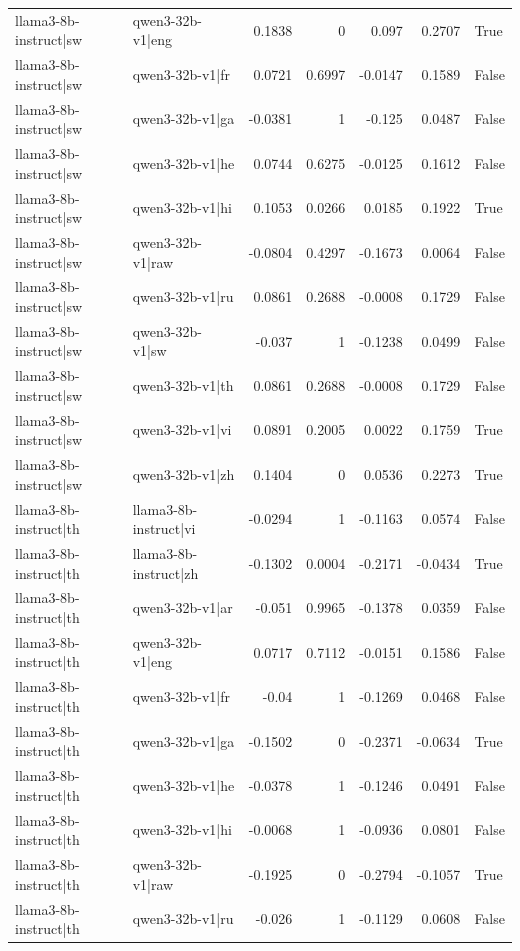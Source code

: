 \begin{table}
\begin{tabular}{l l r r r r l}
llama3-8b-instruct|sw & qwen3-32b-v1|eng & 0.1838 & 0 & 0.097 & 0.2707 & True \\
llama3-8b-instruct|sw & qwen3-32b-v1|fr & 0.0721 & 0.6997 & -0.0147 & 0.1589 & False \\
llama3-8b-instruct|sw & qwen3-32b-v1|ga & -0.0381 & 1 & -0.125 & 0.0487 & False \\
llama3-8b-instruct|sw & qwen3-32b-v1|he & 0.0744 & 0.6275 & -0.0125 & 0.1612 & False \\
llama3-8b-instruct|sw & qwen3-32b-v1|hi & 0.1053 & 0.0266 & 0.0185 & 0.1922 & True \\
llama3-8b-instruct|sw & qwen3-32b-v1|raw & -0.0804 & 0.4297 & -0.1673 & 0.0064 & False \\
llama3-8b-instruct|sw & qwen3-32b-v1|ru & 0.0861 & 0.2688 & -0.0008 & 0.1729 & False \\
llama3-8b-instruct|sw & qwen3-32b-v1|sw & -0.037 & 1 & -0.1238 & 0.0499 & False \\
llama3-8b-instruct|sw & qwen3-32b-v1|th & 0.0861 & 0.2688 & -0.0008 & 0.1729 & False \\
llama3-8b-instruct|sw & qwen3-32b-v1|vi & 0.0891 & 0.2005 & 0.0022 & 0.1759 & True \\
llama3-8b-instruct|sw & qwen3-32b-v1|zh & 0.1404 & 0 & 0.0536 & 0.2273 & True \\
llama3-8b-instruct|th & llama3-8b-instruct|vi & -0.0294 & 1 & -0.1163 & 0.0574 & False \\
llama3-8b-instruct|th & llama3-8b-instruct|zh & -0.1302 & 0.0004 & -0.2171 & -0.0434 & True \\
llama3-8b-instruct|th & qwen3-32b-v1|ar & -0.051 & 0.9965 & -0.1378 & 0.0359 & False \\
llama3-8b-instruct|th & qwen3-32b-v1|eng & 0.0717 & 0.7112 & -0.0151 & 0.1586 & False \\
llama3-8b-instruct|th & qwen3-32b-v1|fr & -0.04 & 1 & -0.1269 & 0.0468 & False \\
llama3-8b-instruct|th & qwen3-32b-v1|ga & -0.1502 & 0 & -0.2371 & -0.0634 & True \\
llama3-8b-instruct|th & qwen3-32b-v1|he & -0.0378 & 1 & -0.1246 & 0.0491 & False \\
llama3-8b-instruct|th & qwen3-32b-v1|hi & -0.0068 & 1 & -0.0936 & 0.0801 & False \\
llama3-8b-instruct|th & qwen3-32b-v1|raw & -0.1925 & 0 & -0.2794 & -0.1057 & True \\
llama3-8b-instruct|th & qwen3-32b-v1|ru & -0.026 & 1 & -0.1129 & 0.0608 & False \\

\end{tabular}
\end{table}
